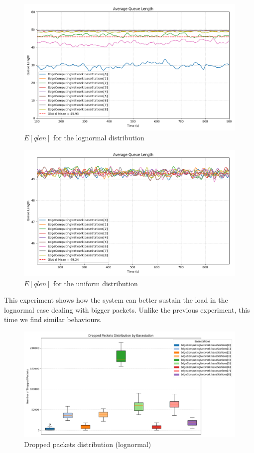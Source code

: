 \documentclass{report}
\begin{document}
\begin{figure}[H]
    \centering
    \includegraphics[width=\textwidth]{img/plots/log_1e4_A/qlen.png}
    \caption{$E[qlen]$ for the lognormal distribution}
\end{figure}

\begin{figure}[H]
    \centering
    \includegraphics[width=\textwidth]{img/plots/uni_1e4_A/qlen.png}
    \caption{$E[qlen]$ for the uniform distribution}
\end{figure}

This experiment shows how the system can better sustain the load in the lognormal case dealing with bigger packets. Unlike the previous experiment, this time we find similar behaviours.

\begin{figure}[H]
    \centering
    \includegraphics[width=\textwidth]{img/plots/log_1e4_A/dropped.png}
    \caption{Dropped packets distribution (lognormal)}
\end{figure}
\end{document}
